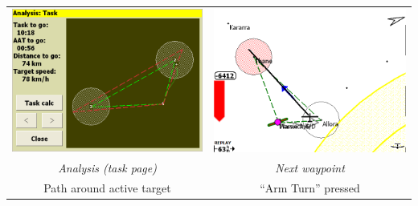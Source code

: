 \begin{maxipage}
\begin{center}
\begin{longtable}{|c|c|}
\midrule
\includegraphics[angle=0,width=0.45\linewidth,keepaspectratio='true']{figures/faat05.png} & 
\includegraphics[angle=0,width=0.45\linewidth,keepaspectratio='true']{figures/faat06.png} \\
{\em Analysis (task page)} & {\em Next waypoint} \\
Path around active target  & ``Arm Turn'' pressed \\
\bottomrule
\end{longtable}
\end{center}
\end{maxipage}

